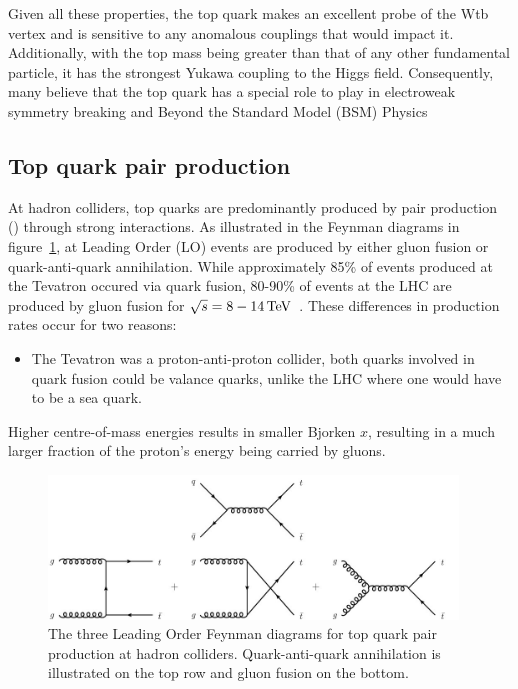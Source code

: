 Given all these properties, the top quark makes an excellent probe of the Wtb vertex and is sensitive to any anomalous couplings that would impact it.
Additionally, with the top mass being greater than that of any other fundamental particle, it has the strongest Yukawa coupling to the Higgs field.
Consequently, many believe that the top quark has a special role to play in electroweak symmetry breaking and Beyond the Standard Model (BSM) Physics~\cite{Giammanco:2017xyn}
 

\subsection{Top quark pair production}\label{subsec:ttbarTheory}
At hadron colliders, top quarks are predominantly produced by pair production (\ttbar) through strong interactions.
As illustrated in the Feynman diagrams in figure~\ref{fig:feyn_ttbar}, at Leading Order (LO) \ttbar events are produced by either gluon fusion or quark-anti-quark annihilation. 
While approximately 85\% of \ttbar events produced at the Tevatron occured via quark fusion, 80-90\% of \ttbar events at the LHC are produced by gluon fusion for $\sqrt{s} = 8-14\,\text{Te\hspace{-.08em}V}$~\cite{Tanabashi:2018oca,Deliot:2011np}.
These differences in production rates occur for two reasons:
\begin{itemize}
\item The Tevatron was a proton-anti-proton collider, both quarks involved in quark fusion could be valance quarks, unlike the LHC where one would have to be a sea quark. 
\end{itemize} Higher centre-of-mass energies results in smaller Bjorken $x$, resulting in a much larger fraction of the proton's energy being carried by gluons.	 

\begin{figure}[htbp]
\begin{center}
\includegraphics[width=0.97\textwidth]{figs/top-physics/ttbar_feyn.jpg}
\caption{The three Leading Order Feynman diagrams for top quark pair production at hadron colliders. Quark-anti-quark annihilation is illustrated on the top row and gluon fusion on the bottom.}
\label{fig:feyn_ttbar}
\end{center}
\end{figure}

